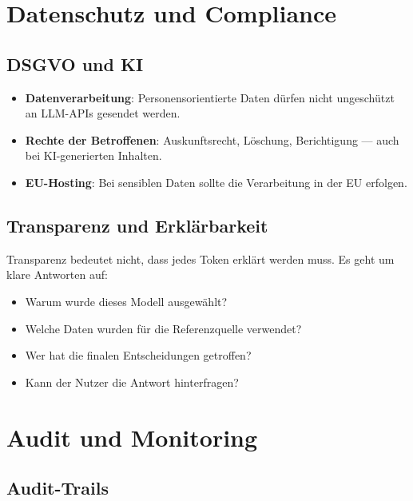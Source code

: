 \section{Datenschutz und Compliance}

\subsection{DSGVO und KI}

\begin{itemize}[leftmargin=*]
     \item \textbf{Datenverarbeitung}: Personensorientierte Daten dürfen nicht ungeschützt an LLM-APIs gesendet werden.
     \item \textbf{Rechte der Betroffenen}: Auskunftsrecht, Löschung, Berichtigung --- auch bei KI-generierten Inhalten.
     \item \textbf{EU-Hosting}: Bei sensiblen Daten sollte die Verarbeitung in der EU erfolgen.
\end{itemize}

\subsection{Transparenz und Erklärbarkeit}

Transparenz bedeutet nicht, dass jedes Token erklärt werden muss. Es geht um klare Antworten auf:

\begin{itemize}[leftmargin=*]
     \item Warum wurde dieses Modell ausgewählt?
     \item Welche Daten wurden für die Referenzquelle verwendet?
     \item Wer hat die finalen Entscheidungen getroffen?
     \item Kann der Nutzer die Antwort hinterfragen?
\end{itemize}

\section{Audit und Monitoring}

\subsection{Audit-Trails}

